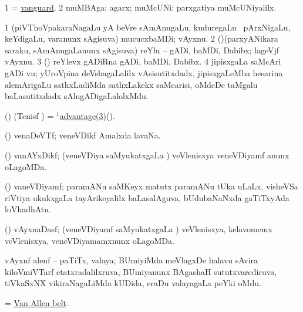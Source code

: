 \bentry
{} 
\gl{\nA}
\expl{}
\bmng
\bnum
\num{1} = \hyperlink{vanguard}{vanguard}. 
\num{2} muMBAga; agarx; muMcUNi:  parxgatiya muMcUNiyalilx. 
\enum
\emng
\eentry

\bentry
{} 
\gl{\nA}
\expl{}
\bmng
\bnum
\num{1} (piVThoVpakaraNagaLu yA beVre sAmAnugaLu, kuduregaLu \mo\ pArxNigaLu, keYdigaLu, \mo varanunx sAgisuva) mucucxbaMDi; vAyxnu. 
\num{2} (\birx)(parxyANikara saraku, sAmAnugaLanunx sAgisuva) reYlu -- gADi, baMDi, Dabibx; lageVjf vAyxnu. 
\num{3} (\birx) reYlevx gADiRna gADi, baMDi, Dabibx. 
\num{4} jipisxgaLa saMcAri gADi \mo vu; yUroVpina deVshagaLalilx vAsisutitxdadx, jipisxgaLeMba hesarina alemArigaLu sathxLadiMda sathxLakekx saMcarisi, oMdeDe taMgalu baLasutitxdadx sAlugADigaLalolxMdu. 
\enum
\emng
\eentry

\bentry
{} 
\gl{\nA}
\expl{}
\bmng
 (\birx) (Tenisf \AmA) = \hyperref{kandict_a.pdf}{A}{advantage(1)3}{$^1$advantage(3)}(\saMkiSx). 
\emng
\eentry

\bentry
{} 
\gl{\nA}
\expl{}
\bmng
 (\ravi) venaDeVTf; veneVDikf Amalxda lavaNa. 
\emng
\eentry

\bentry
{} 
\gl{\gu}
\expl{}
\bmng
 (\ravi) vanAYxDikf; (veneVDiya saMyukatxgaLa \vi)  veVlenisxya veneVDiyamf anunx oLagoMDa. 
\emng
\eentry

\bentry
{} 
\gl{\nA}
\expl{}
\bmng
 (\ravi) vaneVDiyamf; paramANu saMKeyx  matutx paramANu tUka uLaLx, visheVSa riVtiya ukukxgaLa tayArikeyalilx baLasalAguva, bUdubaNaNxda gaTiTxyAda loVhadhAtu. 
\emng
\eentry

\bentry
{} 
\gl{\gu}
\expl{}
\bmng
 (\ravi) vAyxnaDasf; (veneVDiyamf saMyukatxgaLa \vi)  veVlenisxya, kelavomemx  veVlenisxya, veneVDiyamamxnunx oLagoMDa. 
\emng
\eentry

\bentry
{}
\gl{\nA}
\expl{}
\bmng
 vAyxnf alenf -- paTiTx, valaya; BUmiyiMda meVlagxDe halavu sAvira kiloVmiVTarf etatxradalilxruva, BUmiyanunx BAgashaH sututxvarediruva, tiVkaSxNX vikiraNagaLiMda kUDida, eraDu valayagaLa peYki oMdu. 
\emng
\eentry

\bentry
{}
\gl{\nA}
\expl{}
\bmng
 = \hyperlink{Van Allen belt}{Van Allen belt}. 
\emng
\eentry

